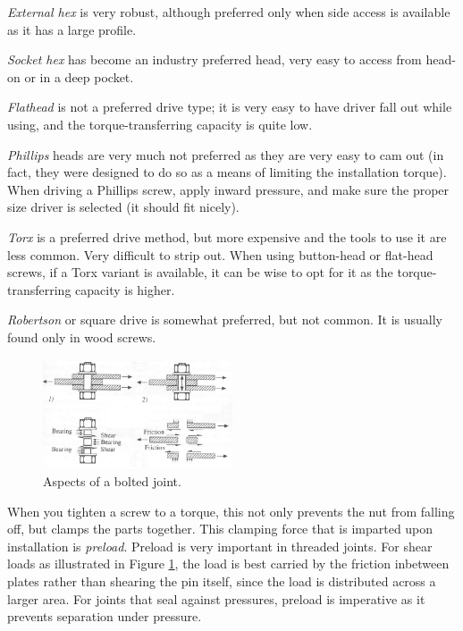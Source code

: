 \documentclass[10pt,letterpaper]{book}
\begin{document}
	\begin{asparaenum}[a)]
		\item \textit{External hex} is very robust, although preferred only when side access is available as it has a large profile.
		\item \textit{Socket hex} has become an industry preferred head, very easy to access from head-on or in a deep pocket.
		\item \textit{Flathead} is not a preferred drive type; it is very easy to have driver fall out while using, and the torque-transferring capacity is quite low.
		\item \textit{Phillips} heads are very much not preferred as they are very easy to cam out (in fact, they were designed to do so as a means of limiting the installation torque). When driving a Phillips screw, apply inward pressure, and make sure the proper size driver is selected (it should fit nicely).
		\item \textit{Torx} is a preferred drive method, but more expensive and the tools to use it are less common. Very difficult to strip out. When using button-head or flat-head screws, if a Torx variant is available, it can be wise to opt for it as the torque-transferring capacity is higher.
		\item \textit{Robertson} or square drive is somewhat preferred, but not common. It is usually found only in wood screws.
	\end{asparaenum}
	
	
	\begin{figure}[H]
		\includegraphics[width=0.5\textwidth]{imgs/bolt_preload.png}
		\caption{Aspects of a bolted joint.}
		 \label{fig:bolted_joint} 
	\end{figure}
	
	When you tighten a screw to a torque, this not only prevents the nut from falling off, but clamps the parts together. This clamping force that is imparted upon installation is \textit{preload}. Preload is very important in threaded joints. For shear loads as illustrated in Figure \ref{fig:bolted_joint}, the load is best carried by the friction inbetween plates rather than shearing the pin itself, since the load is distributed across a larger area. For joints that seal against pressures, preload is imperative as it prevents separation under pressure.
	
\end{document}
